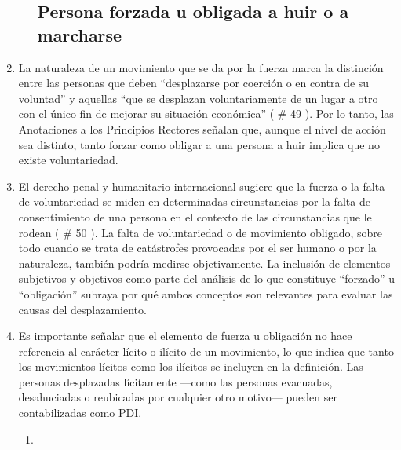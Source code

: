 \documentclass[
]{book}
\begin{document}
\begin{enumerate}
\begin{enumerate}
{    \subsection{Persona forzada u obligada a huir o a marcharse}\label{persona-forzada-u-obligada-a-huir-o-a-marcharse}}
  \end{enumerate}
\item
  La naturaleza de un movimiento que se da por la fuerza marca la distinción entre las personas que deben ``desplazarse por coerción o en contra de su voluntad'' y aquellas ``que se desplazan voluntariamente de un lugar a otro con el único fin de mejorar su situación económica'' (
  \# 49
  ). Por lo tanto, las Anotaciones a los Principios Rectores señalan que, aunque el nivel de acción sea distinto, tanto forzar como obligar a una persona a huir implica que no existe voluntariedad.
\item
  El derecho penal y humanitario internacional sugiere que la fuerza o la falta de voluntariedad se miden en determinadas circunstancias por la falta de consentimiento de una persona en el contexto de las circunstancias que le rodean (
  \# 50
  ). La falta de voluntariedad o de movimiento obligado, sobre todo cuando se trata de catástrofes provocadas por el ser humano o por la naturaleza, también podría medirse objetivamente. La inclusión de elementos subjetivos y objetivos como parte del análisis de lo que constituye ``forzado'' u ``obligación'' subraya por qué ambos conceptos son relevantes para evaluar las causas del desplazamiento.
\item
  Es importante señalar que el elemento de fuerza u obligación no hace referencia al carácter lícito o ilícito de un movimiento, lo que indica que tanto los movimientos lícitos como los ilícitos se incluyen en la definición. Las personas desplazadas lícitamente ---como las personas evacuadas, desahuciadas o reubicadas por cualquier otro motivo--- pueden ser contabilizadas como PDI.

  \begin{enumerate}
  \def\labelenumii{\arabic{enumii}.}
  \item ~
    \hypertarget{hogares-o-lugares-de-residencia-habitual}{%
}
\end{enumerate}
\end{enumerate}
\end{document}
